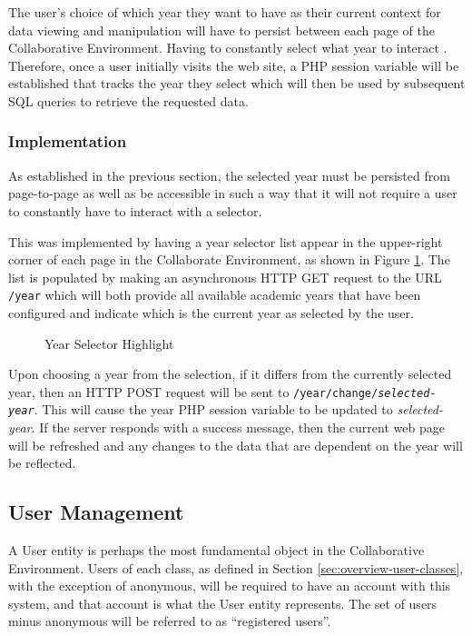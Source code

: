 The user's choice of which year they want to have as their current context for data viewing and manipulation will have to persist between each page of the Collaborative Environment. Having to constantly select what year to interact . Therefore, once a user initially visits the web site, a PHP session variable will be established that tracks the year they select which will then be used by subsequent SQL queries to retrieve the requested data.

\subsubsection{Implementation}
As established in the previous section, the selected year must be persisted from page-to-page as well as be accessible in such a way that it will not require a user to constantly have to interact with a selector.

This was implemented by having a year selector list appear in the upper-right corner of each page in the Collaborate Environment, as shown in Figure \ref{fig:screens-year}. The list is populated by making an asynchronous HTTP GET request to the URL \texttt{/year} which will both provide all available academic years that have been configured and indicate which is the current year as selected by the user.

\begin{figure}[h!]
	\centering
	\caption{Year Selector Highlight}
	\label{fig:screens-year}
\end{figure}

Upon choosing a year from the selection, if it differs from the currently selected year, then an HTTP POST request will be sent to \texttt{/year/change/\textit{selected-year}}. This will cause the year PHP session variable to be updated to \emph{selected-year}. If the server responds with a success message, then the current web page will be refreshed and any changes to the data that are dependent on the year will be reflected.

\subsection{User Management}
\label{subsec:design-user}
A User entity is perhaps the most fundamental object in the Collaborative Environment.  Users of each class, as defined in Section \ref{sec:overview-user-classes}, with the exception of anonymous, will be required to have an account with this system, and that account is what the User entity represents. The set of users minus anonymous will be referred to as ``registered users''.

